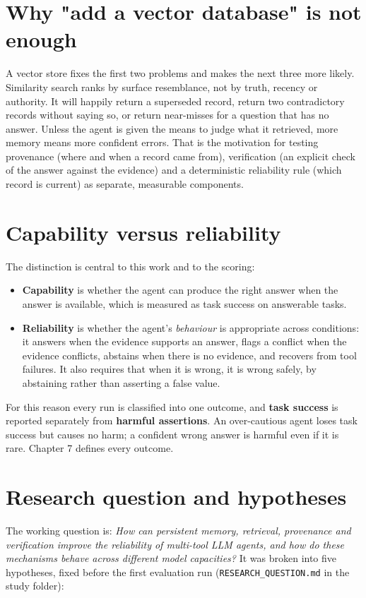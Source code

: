 \documentclass[10.5pt,a4paper,oneside]{report}
\begin{document}
\section{Why "add a vector database" is not enough}
A vector store fixes the first two problems and makes the next three more likely. Similarity search ranks by surface resemblance, not by truth, recency or authority. It will happily return a superseded record, return two contradictory records without saying so, or return near-misses for a question that has no answer. Unless the agent is given the means to judge what it retrieved, more memory means more confident errors. That is the motivation for testing provenance (where and when a record came from), verification (an explicit check of the answer against the evidence) and a deterministic reliability rule (which record is current) as separate, measurable components.

\section{Capability versus reliability}
The distinction is central to this work and to the scoring:

\begin{itemize}
\item \textbf{Capability} is whether the agent can produce the right answer when the answer is available, which is measured as task success on answerable tasks.
\item \textbf{Reliability} is whether the agent's \emph{behaviour} is appropriate across conditions: it answers when the evidence supports an answer, flags a conflict when the evidence conflicts, abstains when there is no evidence, and recovers from tool failures. It also requires that when it is wrong, it is wrong safely, by abstaining rather than asserting a false value.
\end{itemize}
For this reason every run is classified into one outcome, and \textbf{task success} is reported separately from \textbf{harmful assertions}. An over-cautious agent loses task success but causes no harm; a confident wrong answer is harmful even if it is rare. Chapter 7 defines every outcome.

\section{Research question and hypotheses}
The working question is: \emph{How can persistent memory, retrieval, provenance and verification improve the reliability of multi-tool LLM agents, and how do these mechanisms behave across different model capacities?} It was broken into five hypotheses, fixed before the first evaluation run (\texttt{RESEARCH\_\allowbreak{}QUESTION.\allowbreak{}md} in the study folder):
\end{document}
